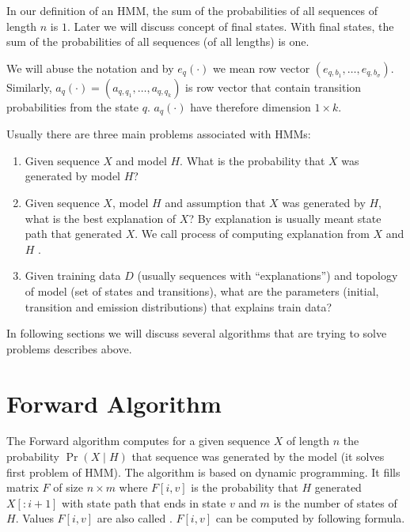 \begin{note}
In our  definition of an HMM, the sum of the probabilities of all sequences of
length $n$ is $1$. Later we will discuss concept of final states. With final
states, the sum of the probabilities of all sequences (of all lengths) is one.

\end{note}

We will abuse the notation and by $e_q(\cdot)$ we mean row vector
$\left(e_{q,b_1},\dots,e_{q,b_{\sigma}}\right)$. Similarly,
$a_q(\cdot)=\left(a_{q,q_1},\dots,a_{q,q_k}\right)$ is row vector that contain
transition probabilities from the state $q$.  $a_q(\cdot)$ have therefore
dimension $1\times k$.

Usually there are three main problems associated with
HMMs\cite{}:
\begin{enumerate}
\item Given sequence $X$ and model $H$. What is the probability that $X$ was
generated by model $H$?
\item Given sequence $X$, model $H$ and assumption that $X$ was generated by 
$H$, what is the best explanation of $X$? By explanation is usually meant state
path that generated $X$. We call process of computing explanation from $X$ and
$H$ .
\item Given training data $D$ (usually sequences with ``explanations'') and
topology of model (set of states and transitions), what are the parameters
(initial, transition and emission distributions) that explains train
data?
\end{enumerate} 
In following sections we will discuss several algorithms
that are trying to solve problems describes above.



\section{Forward Algorithm}
The Forward algorithm \cite{Durbin1998} computes for a given sequence $X$ of
length $n$ the probability $\Pr\left(X\mid H\right)$ that sequence was
generated by the model (it solves first problem of HMM). The algorithm is based on dynamic programming. It fills
matrix $F$ of size $n\times m$ where $F[i,v]$ is the probability that $H$
generated $X[:i+1]$ with state path that ends in state $v$ and $m$ is the number
of states of $H$. Values $F[i,v]$ are also called . $F[i,v]$ can be computed by following formula.

